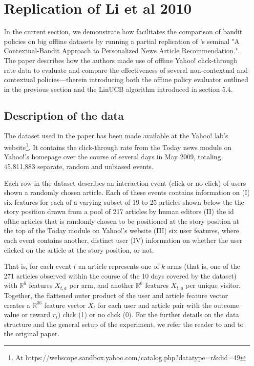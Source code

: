 \documentclass{jss}\usepackage[]{graphicx}\usepackage[]{color}
\begin{document}
\section{Replication of Li et al 2010}

In the current section, we demonstrate how  facilitates the comparison of bandit policies on big offline datasets by running a partial replication of \cite{Li2010}'s seminal "A Contextual-Bandit Approach to Personalized News Article Recommendation.". The paper describes how the authors made use of offline Yahoo! click-through rate data to evaluate and compare the effectiveness of several non-contextual and contextual policies---therein introducing both the offline policy evaluator outlined in the previous section and the LinUCB algorithm introduced in section 5.4.

\subsection{Description of the data}

The dataset used in the \cite{Li2010} paper has been made available at the Yahoo! lab's website\footnote{At https://webscope.sandbox.yahoo.com/catalog.php?datatype=r\&did=49}. It contains the click-through rate from the Today news module on Yahoo!'s homepage over the course of several days in May 2009, totaling 45,811,883 separate, random and unbiased events.

Each row in the dataset describes an interaction event (click or no click) of users shown a randomly chosen article. Each of these events contains information on (I) six features for each of a varying subset of 19 to 25 articles shown below the the story position drawn from a pool of 217 articles by human editors (II) the id ofthe articles that is randomly chosen to be positioned at the story position at the top of the Today module on Yahoo!'s website (III) six user features, where each event contains another, distinct user (IV) information on whether the user clicked on the article at the story position, or not.

That is, for each event $t$ an article represents one of $k$ arms (that is, one of the 271 articles observed within the course of the 10 days covered by the dataset) with $\mathbb{R}^6$ features $X_{t,a}$ per arm, and another $\mathbb{R}^6$ features $X_{t,u}$ per unique visitor. Together, the flattened outer product of the user and article feature vector creates a $\mathbb{R}^{36}$ feature vector $X_t$ for each user and article pair with the outcome value or reward $r_t$) click (1) or no click (0). For the further details on the data structure and the general setup of the experiment, we refer the reader to \cite{Chu2009} and to the original \cite{Li2010} paper.
\end{document}
